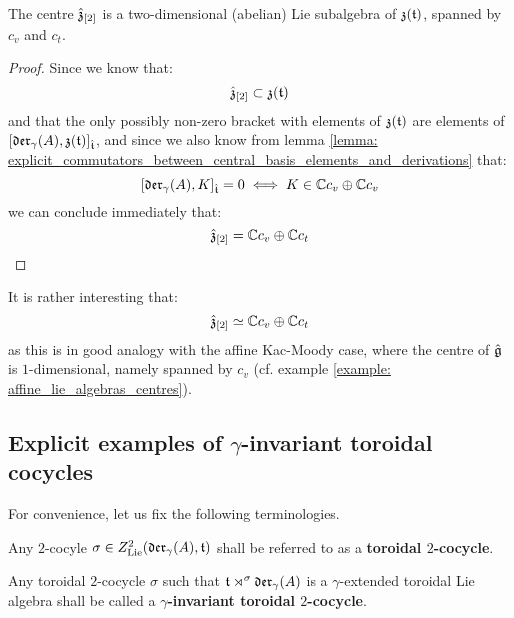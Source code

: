         \begin{proposition} \label{prop: centres_of_yangian_extended_toroidal_lie_algebras}
            The centre $\hat{\mathfrak{z}}_{[2]}$ is a two-dimensional (abelian) Lie subalgebra of $\mathfrak{z}(\mathfrak{t})$, spanned by $c_v$ and $c_t$. 
        \end{proposition}
            \begin{proof}
                Since we know that:
                    $$\hat{\mathfrak{z}}_{[2]} \subset \mathfrak{z}(\mathfrak{t})$$
                and that the only possibly non-zero bracket with elements of $\mathfrak{z}(\mathfrak{t})$ are elements of $[\mathfrak{der}_{\gamma}(A), \mathfrak{z}(\mathfrak{t})]_{\hat{\mathfrak{t}}}$, and since we also know from lemma \ref{lemma: explicit_commutators_between_central_basis_elements_and_derivations} that:
                    $$[\mathfrak{der}_{\gamma}(A), K]_{\hat{\mathfrak{t}}} = 0 \iff K \in \mathbb{C} c_v \oplus \mathbb{C} c_v$$
                we can conclude immediately that:
                    $$\hat{\mathfrak{z}}_{[2]} = \mathbb{C} c_v \oplus \mathbb{C} c_t$$
            \end{proof}
        \begin{remark}
            It is rather interesting that:
                $$\hat{\mathfrak{z}}_{[2]} \simeq \mathbb{C} c_v \oplus \mathbb{C} c_t$$
            as this is in good analogy with the affine Kac-Moody case, where the centre of $\hat{\mathfrak{g}}$ is $1$-dimensional, namely spanned by $c_v$ (cf. example \ref{example: affine_lie_algebras_centres}).
        \end{remark}

    \subsection{Explicit examples of $\gamma$-invariant toroidal cocycles}
        For convenience, let us fix the following terminologies.
        \begin{definition} \label{def: yangian_toroidal_cocycles}
            Any $2$-cocyle $\sigma \in Z^2_{\mathrm{Lie}}(\mathfrak{der}_{\gamma}(A), \mathfrak{t})$ shall be referred to as a \textbf{toroidal $2$-cocycle}.
            
            Any toroidal $2$-cocycle $\sigma$ such that $\mathfrak{t} \rtimes^{\sigma} \mathfrak{der}_{\gamma}(A)$ is a $\gamma$-extended toroidal Lie algebra shall be called a \textbf{$\gamma$-invariant toroidal $2$-cocycle}.
        \end{definition}
        
